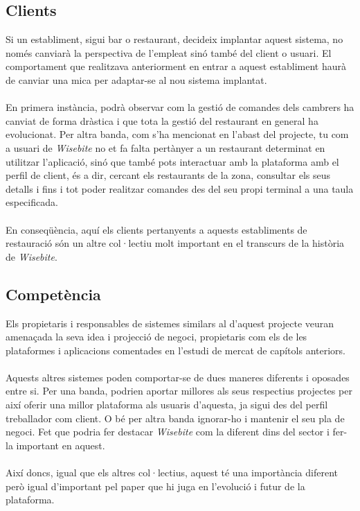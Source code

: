 \subsection{Clients}
Si un establiment, sigui bar o restaurant, decideix implantar aquest sistema, no només canviarà la perspectiva de l'empleat sinó també del client o usuari. El comportament que realitzava anteriorment en entrar a aquest establiment haurà de canviar una mica per adaptar-se al nou sistema implantat.
\\\\
En primera instància, podrà observar com la gestió de comandes dels cambrers ha canviat de forma dràstica i que tota la gestió del restaurant en general ha evolucionat. Per altra banda, com s'ha mencionat en l'abast del projecte, tu com a usuari de \textit{Wisebite} no et fa falta pertànyer a un restaurant determinat en utilitzar l'aplicació, sinó que també pots interactuar amb la plataforma amb el perfil de client, és a dir, cercant els restaurants de la zona, consultar els seus detalls i fins i tot poder realitzar comandes des del seu propi terminal a una taula especificada.
\\\\
En conseqüència, aquí els clients pertanyents a aquests establiments de restauració són un altre col·lectiu molt important en el transcurs de la història de \textit{Wisebite}.

\subsection{Competència}
Els propietaris i responsables de sistemes similars al d'aquest projecte veuran amenaçada la seva idea i projecció de negoci, propietaris com els de les plataformes i aplicacions comentades en l'estudi de mercat de capítols anteriors.
\\\\
Aquests altres sistemes poden comportar-se de dues maneres diferents i oposades entre si. Per una banda, podrien aportar millores als seus respectius projectes per així oferir una millor plataforma als usuaris d'aquesta, ja sigui des del perfil treballador com client. O bé per altra banda ignorar-ho i mantenir el seu pla de negoci. Fet que podria fer destacar \textit{Wisebite} com la diferent dins del sector i fer-la important en aquest.
\\\\
Així doncs, igual que els altres col·lectius, aquest té una importància diferent però igual d'important pel paper que hi juga en l'evolució i futur de la plataforma.


